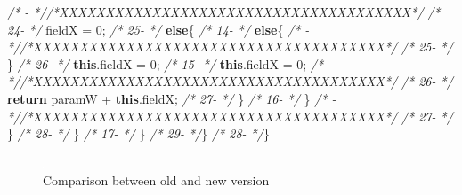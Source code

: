 \documentclass[
]{article}
\newenvironment{Shaded}{\begin{snugshade}}{\end{snugshade}}
\newcommand{\CommentTok}[1]{\textcolor[rgb]{0.56,0.35,0.01}{\textit{#1}}}
\newcommand{\DecValTok}[1]{\textcolor[rgb]{0.00,0.00,0.81}{#1}}
\newcommand{\FunctionTok}[1]{\textcolor[rgb]{0.00,0.00,0.00}{#1}}
\newcommand{\KeywordTok}[1]{\textcolor[rgb]{0.13,0.29,0.53}{\textbf{#1}}}
\newcommand{\NormalTok}[1]{#1}
\begin{document}
\begin{landscape}
\begin{Shaded}
\begin{Highlighting}[]
\CommentTok{/*   -                 *//*XXXXXXXXXXXXXXXXXXXXXXXXXXXXXXXXXXXXXX*/}                     \CommentTok{/* 24-                 */}\NormalTok{            fieldX = }\DecValTok{0}\NormalTok{;                                        }
\CommentTok{/* 25-                 */}        \KeywordTok{else}\NormalTok{\{                                                  }\CommentTok{/* 14-                 */}        \KeywordTok{else}\NormalTok{\{                                                  }
\CommentTok{/*   -                 *//*XXXXXXXXXXXXXXXXXXXXXXXXXXXXXXXXXXXXXX*/}                     \CommentTok{/* 25-                 */}\NormalTok{        \}                                                      }
\CommentTok{/* 26-                 */}            \KeywordTok{this}\NormalTok{.}\FunctionTok{fieldX}\NormalTok{ = }\DecValTok{0}\NormalTok{;                                   }\CommentTok{/* 15-                 */}            \KeywordTok{this}\NormalTok{.}\FunctionTok{fieldX}\NormalTok{ = }\DecValTok{0}\NormalTok{;                                   }
\CommentTok{/*   -                 *//*XXXXXXXXXXXXXXXXXXXXXXXXXXXXXXXXXXXXXX*/}                     \CommentTok{/* 26-                 */}        \KeywordTok{return}\NormalTok{ paramW + }\KeywordTok{this}\NormalTok{.}\FunctionTok{fieldX}\NormalTok{;                           }
\CommentTok{/* 27-                 */}\NormalTok{        \}                                                      }\CommentTok{/* 16-                 */}\NormalTok{        \}                                                      }
\CommentTok{/*   -                 *//*XXXXXXXXXXXXXXXXXXXXXXXXXXXXXXXXXXXXXX*/}                     \CommentTok{/* 27-                 */}\NormalTok{     \}                                                         }
\CommentTok{/* 28-                 */}\NormalTok{    \}                                                          }\CommentTok{/* 17-                 */}\NormalTok{    \}                                                          }
\CommentTok{/* 29-                 */}\NormalTok{\}                                                              }\CommentTok{/* 28-                 */}\NormalTok{\}                                                              }
\end{Highlighting}
\end{Shaded}

\normalsize

\begin{figure}
\centering
\includegraphics{figures/fake.png}
\caption{Comparison between old and new version
\label{comparison_changing_method_order_2}}
\end{figure}

\end{landscape}
\end{document}
